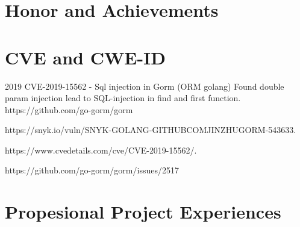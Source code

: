 \documentclass[10pt]{article} %
\begin{document}

\section{Honor and Achievements}






\section{CVE and CWE-ID}
\job
{2019}{}
{CVE-2019-15562 - {Sql injection in Gorm (ORM golang)}}
{Found double param injection lead to SQL-injection in find and first function.}
{https://github.com/go-gorm/gorm}
{

    \begin{itemize-noindent}
        \item{https://snyk.io/vuln/SNYK-GOLANG-GITHUBCOMJINZHUGORM-543633.}
        \item{https://www.cvedetails.com/cve/CVE-2019-15562/.}
        \item{https://github.com/go-gorm/gorm/issues/2517}
    
    \end{itemize-noindent}

}


\section{Propesional Project Experiences}
\end{document}
